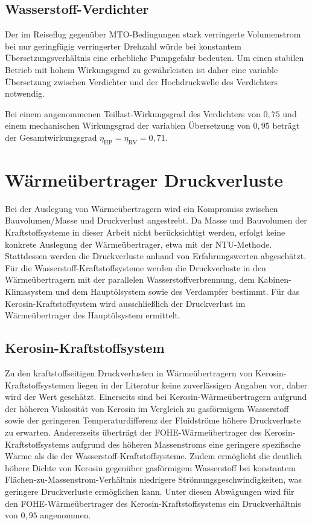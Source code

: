 \subsection{Wasserstoff-Verdichter}

Der im Reiseflug gegenüber MTO-Bedingungen stark verringerte Volumenstrom bei nur geringfügig verringerter Drehzahl würde bei konstantem Übersetzungsverhältnis eine erhebliche Pumpgefahr bedeuten. Um einen stabilen Betrieb mit hohem Wirkungsgrad zu gewährleisten ist daher eine variable Übersetzung zwischen Verdichter und der Hochdruckwelle des Verdichters notwendig. 

Bei einem angenommenen Teillast-Wirkungsgrad des Verdichters von $0,75$ und einem mechanischen Wirkungsgrad der variablen Übersetzung von $0,95$ beträgt der Gesamtwirkungsgrad $\eta_{\mathrm{HP}}=\eta_\mathrm{RV}=0,71$.

\section{Wärmeübertrager Druckverluste}

Bei der Auslegung von Wärmeübertragern wird ein Kompromiss zwischen Bauvolumen/Masse und Druckverlust angestrebt. Da Masse und Bauvolumen der Kraftstoffsysteme in dieser Arbeit nicht berücksichtigt werden, erfolgt keine konkrete Auslegung der Wärmeübertrager, etwa mit der NTU-Methode. Stattdessen werden die Druckverluste anhand von Erfahrungswerten abgeschätzt. Für die Wasserstoff-Kraftstoffsysteme werden die Druckverluste in den Wärmeübertragern mit der parallelen Wasserstoffverbrennung, dem Kabinen-Klimasystem und dem Hauptölsystem sowie des Verdampfer bestimmt. Für das Kerosin-Kraftstoffsystem wird ausschließlich der Druckverlust im Wärmeübertrager des Hauptölsystem ermittelt.

\subsection{Kerosin-Kraftstoffsystem}

Zu den kraftstoffseitigen Druckverlusten in Wärmeübertragern von Kerosin-Kraftstoffsystemen liegen in der Literatur keine zuverlässigen Angaben vor, daher wird der Wert geschätzt. Einerseits sind bei Kerosin-Wärmeübertragern aufgrund der höheren Viskosität von Kerosin im Vergleich zu gasförmigem Wasserstoff sowie der geringeren Temperaturdifferenz der Fluidströme höhere Druckverluste zu erwarten. Andererseits überträgt der FOHE-Wärmeübertrager des Kerosin-Kraftstoffsystems aufgrund des höheren Massenstroms eine geringere spezifische Wärme als die der Wasserstoff-Kraftstoffsysteme. Zudem ermöglicht die deutlich höhere Dichte von Kerosin gegenüber gasförmigem Wasserstoff bei konstantem Flächen-zu-Massenstrom-Verhältnis niedrigere Strömungsgeschwindigkeiten, was geringere Druckverluste ermöglichen kann. Unter diesen Abwägungen wird für den FOHE-Wärmeübertrager des Kerosin-Kraftstoffsystems ein Druckverhältnis von $0,95$ angenommen.

